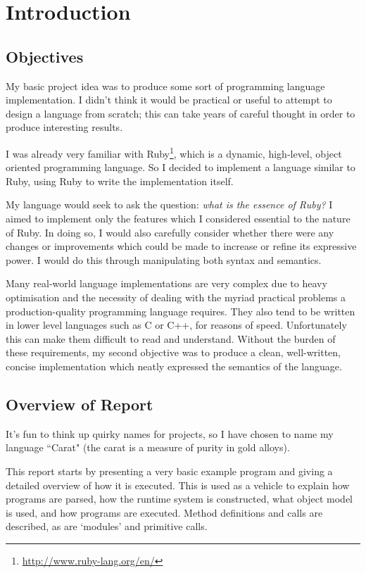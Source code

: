 \section{Introduction}

\subsection{Objectives}

My basic project idea was to produce some sort of programming language implementation. I didn't think it would be practical or useful to attempt to design a language from scratch; this can take years of careful thought in order to produce interesting results.

I was already very familiar with Ruby\footnote{\url{http://www.ruby-lang.org/en/}}, which is a dynamic, high-level, object oriented programming language. So I decided to implement a language similar to Ruby, using Ruby to write the implementation itself.

My language would seek to ask the question: \textit{what is the essence of Ruby?} I aimed to implement only the features which I considered essential to the nature of Ruby. In doing so, I would also carefully consider whether there were any changes or improvements which could be made to increase or refine its expressive power. I would do this through manipulating both syntax and semantics.

Many real-world language implementations are very complex due to heavy optimisation and the necessity of dealing with the myriad practical problems a production-quality programming language requires. They also tend to be written in lower level languages such as C or C++, for reasons of speed. Unfortunately this can make them difficult to read and understand. Without the burden of these requirements, my second objective was to produce a clean, well-written, concise implementation which neatly expressed the semantics of the language.

\subsection{Overview of Report}

It's fun to think up quirky names for projects, so I have chosen to name my language ``Carat" (the carat is a measure of purity in gold alloys).

This report starts by presenting a very basic example program and giving a detailed overview of how it is executed. This is used as a vehicle to explain how programs are parsed, how the runtime system is constructed, what object model is used, and how programs are executed. Method definitions and calls are described, as are `modules' and primitive calls.

